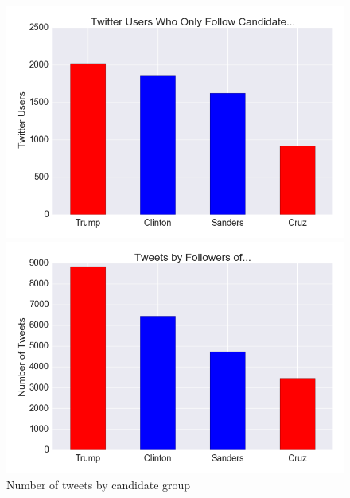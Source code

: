 \documentclass[letterpaper]{article}
\begin{document}


\begin{figure}[t!]  
\centering 
  \includegraphics[width=0.8\columnwidth]{users-by-candid}  

  \includegraphics[width=0.8\columnwidth]{tweets-by-candid}  
  \caption{Number of tweets by candidate group
    \label{fig:tweets-by-candid}}
\end{figure} 
\end{document}
